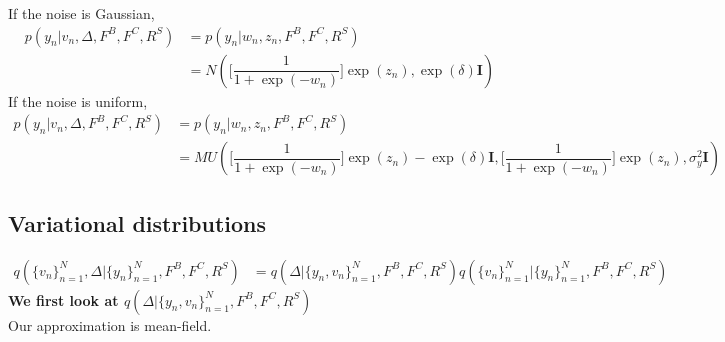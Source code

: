 \documentclass[a4paper]{article}
\begin{document}
If the noise is Gaussian, 
\begin{align*}
    p(y_n | v_n, \Delta, F^B, F^C, R^S) &= p(y_n | w_n, z_n, F^B, F^C, R^S)\\
                                        &= N(\lbrack \dfrac{1}{1+\exp(-w_n)} \rbrack \exp(z_n), \exp(\delta)\mathbf{I})
\end{align*}
If the noise is uniform,
\begin{align*}
    p(y_n | v_n, \Delta, F^B, F^C, R^S) &= p(y_n | w_n, z_n, F^B, F^C, R^S)\\
                                        &= MU(\lbrack \dfrac{1}{1+\exp(-w_n)} \rbrack \exp(z_n)-\exp(\delta)\mathbf{I}, \lbrack \dfrac{1}{1+\exp(-w_n)} \rbrack \exp(z_n), \sigma^2_y\mathbf{I})
\end{align*}
\subsection*{Variational distributions}
\begin{align*}
    q(\{v_n\}_{n=1}^N, \Delta | \{y_n\}_{n=1}^N, F^B, F^C, R^S) &= q(\Delta | \{y_n, v_n\}_{n=1}^N, F^B, F^C, R^S)q(\{v_n\}_{n=1}^N | \{y_n\}_{n=1}^N, F^B, F^C, R^S)
\end{align*}
\textbf{We first look at $q(\Delta | \{y_n, v_n\}_{n=1}^N, F^B, F^C, R^S)$}\\
Our approximation is mean-field.
\end{document}
